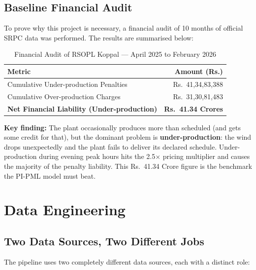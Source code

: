 \documentclass[12pt,a4paper]{report}
\begin{document}
\section{Baseline Financial Audit}

To prove why this project is necessary, a financial audit of 10 months of official SRPC data was performed. The results are summarised below:

\begin{table}[H]
    \centering
    \caption{Financial Audit of RSOPL Koppal --- April 2025 to February 2026}
    \begin{tabular}{lr}
        \toprule
        \textbf{Metric} & \textbf{Amount (Rs.)} \\
        \midrule
        Cumulative Under-production Penalties & Rs.\ 41,34,83,388 \\
        Cumulative Over-production Charges & Rs.\ 31,30,81,483 \\
        \midrule
        \textbf{Net Financial Liability (Under-production)} & \textbf{Rs.\ 41.34 Crores} \\
        \bottomrule
    \end{tabular}
\end{table}

\textbf{Key finding:} The plant occasionally produces more than scheduled (and gets some credit for that), but the dominant problem is \textbf{under-production}: the wind drops unexpectedly and the plant fails to deliver its declared schedule. Under-production during evening peak hours hits the 2.5$\times$ pricing multiplier and causes the majority of the penalty liability. This Rs.\ 41.34 Crore figure is the benchmark the PI-PML model must beat.

\chapter{Data Engineering}

\section{Two Data Sources, Two Different Jobs}

The pipeline uses two completely different data sources, each with a distinct role:
\end{document}
